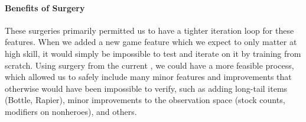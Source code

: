 \documentclass[ocean-paper.tex]{subfiles}
\begin{document}
\paragraph{Benefits of Surgery}
These surgeries primarily permitted us to have a tighter iteration loop for these features. When we added a new game feature which we expect to only matter at high skill, it would simply be impossible to test and iterate on it by training from scratch. Using surgery from the current \openaifive, we could have a more feasible process, which allowed us to safely include many minor features and improvements that otherwise would have been impossible to verify, such as adding long-tail items (Bottle, Rapier), minor improvements to the observation space (stock counts, modifiers on nonheroes), and others.
\end{document}
